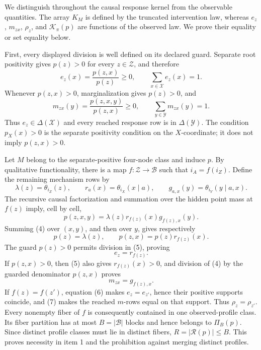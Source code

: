 We distinguish throughout the causal response kernel from the observable
quantities.  The array \(K_M\) is defined by the truncated intervention
law, whereas \(e_z\), \(m_{zx}\), \(\rho_z\), and
\(\mathcal K_\pi(p)\) are functions of the observed law.  We prove their
equality or set equality below.

First, every displayed division is well defined on its declared guard.
Separate root positivity gives \(p(z)>0\) for every
\(z\in\mathcal Z\), and therefore
\[
 e_z(x)=\frac{p(z,x)}{p(z)}\geq 0,
 \qquad
 \sum_{x\in\mathcal X}e_z(x)=1.
 \tag{1}
\]
Whenever \(p(z,x)>0\), marginalization gives \(p(z)>0\), and
\[
 m_{zx}(y)=\frac{p(z,x,y)}{p(z,x)}\geq0,
 \qquad
 \sum_{y\in\mathcal Y}m_{zx}(y)=1.
 \tag{2}
\]
Thus \(e_z\in\Delta(\mathcal X)\) and every reached response row is in
\(\Delta(\mathcal Y)\).  The condition \(p_X(x)>0\) is the separate
positivity condition on the \(X\)-coordinate; it does not imply
\(p(z,x)>0\).

Let \(M\) belong to the separate-positive four-node class and induce
\(p\).  By qualitative functionality, there is a map
\(f:\mathcal Z\to\mathcal B\) such that \(i_A=f(i_Z)\).  Define the
remaining mechanism rows by
\[
 \lambda(z)=\theta_{i_Z}(z),\qquad
 r_a(x)=\theta_{i_X}(x\mid a),\qquad
 g_{a,x}(y)=\theta_{i_Y}(y\mid a,x).
 \tag{3}
\]
The recursive causal factorization and summation over the hidden point
mass at \(f(z)\) imply, cell by cell,
\[
 p(z,x,y)=\lambda(z)r_{f(z)}(x)g_{f(z),x}(y).
 \tag{4}
\]
Summing (4) over \((x,y)\), and then over \(y\), gives respectively
\[
 p(z)=\lambda(z),
 \qquad
 p(z,x)=p(z)r_{f(z)}(x).
 \tag{5}
\]
The guard \(p(z)>0\) permits division in (5), proving
\[
 e_z=r_{f(z)}.
 \tag{6}
\]
If \(p(z,x)>0\), then (5) also gives \(r_{f(z)}(x)>0\), and division of
(4) by the guarded denominator \(p(z,x)\) proves
\[
 m_{zx}=g_{f(z),x}.
 \tag{7}
\]
If \(f(z)=f(z')\), equation (6) makes \(e_z=e_{z'}\), hence their
positive supports coincide, and (7) makes the reached \(m\)-rows equal
on that support.  Thus \(\rho_z=\rho_{z'}\).  Every nonempty fiber of
\(f\) is consequently contained in one observed-profile class.  Its
fiber partition has at most \(B=|\mathcal B|\) blocks and hence belongs
to \(\Pi_B(p)\).  Since distinct profile classes must lie in distinct
fibers, \(R=|\mathcal R(p)|\leq B\).  This proves necessity in item 1
and the prohibition against merging distinct profiles.

